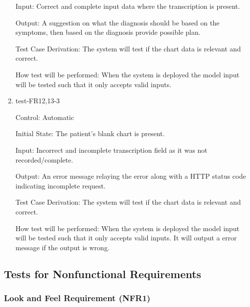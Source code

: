 \documentclass[12pt, titlepage]{article}
\begin{document}
\begin{enumerate}
Input: Correct and complete input data where the transcription is present.

Output: A suggestion on what the diagnosis should be based on the symptoms, then based on the diagnosis provide possible plan.

Test Case Derivation: The system will test if the chart data is relevant and correct.  

How test will be performed: When the system is deployed the model input will be tested such that it only accepts valid inputs.

\item{test-FR12,13-3} \label{test-FR12,13-3}

Control: Automatic

Initial State: The patient's blank chart is present.

Input: Incorrect and incomplete transcription field as it was not recorded/complete.

Output: An error message relaying the error along with a HTTP status code indicating incomplete request.

Test Case Derivation: The system will test if the chart data is relevant and correct.  

How test will be performed: When the system is deployed the model input will be tested such that it only accepts valid inputs. It will output a error message if the output is wrong.

\end{enumerate}


\subsection{Tests for Nonfunctional Requirements} \label{section:4.2}

\subsubsection{Look and Feel Requirement (NFR1)} \label{section:4.2.1}
\end{document}
